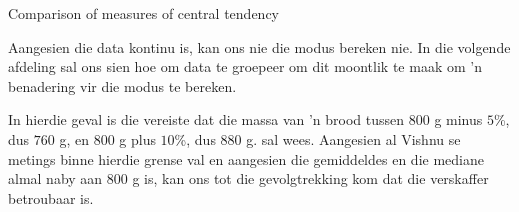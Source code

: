 \begin{wex}{Comparison of measures of central tendency}
{  

  Aangesien die data kontinu is, kan ons nie die modus bereken nie. In die volgende afdeling sal ons sien hoe om data te groepeer om dit moontlik te maak om ’n benadering vir die modus te bereken.


  In hierdie geval is die vereiste dat die massa van ’n brood tussen $800$ g minus $5$\%, dus $760$ g, en $800$ g plus 
  $10$\%, dus $880$ g. sal wees. Aangesien al Vishnu se metings binne hierdie grense val en aangesien die gemiddeldes en die mediane almal naby aan $800$ g is, kan ons tot die gevolgtrekking kom dat die verskaffer betroubaar is.
}
\end{wex}


